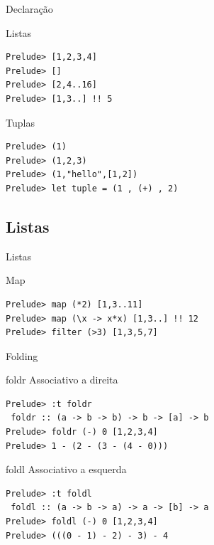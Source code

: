 \documentclass{beamer}
\begin{document}
	\begin{frame}{}
	\end{frame}
	
		\begin{frame}[fragile]{Declaração}
			\begin{block}{Listas}
		\begin{lstlisting}
Prelude> [1,2,3,4]
Prelude> []
Prelude> [2,4..16]
Prelude> [1,3..] !! 5
		 \end{lstlisting}
		\end{block}
		
		\begin{block}{Tuplas}
		\begin{lstlisting}
Prelude> (1)
Prelude> (1,2,3)
Prelude> (1,"hello",[1,2])
Prelude> let tuple = (1 , (+) , 2)
		 \end{lstlisting}
		\end{block}
		
		\end{frame}
	
	\subsection{Listas}
	
	\begin{frame}[fragile]{Listas}
		\begin{block}{Map}
			\begin{lstlisting}
Prelude> map (*2) [1,3..11]
Prelude> map (\x -> x*x) [1,3..] !! 12
Prelude> filter (>3) [1,3,5,7]
			\end{lstlisting}
		\end{block}	 
	\end{frame}
	
	\begin{frame}[fragile]{Folding}
	 \begin{block}{foldr}
	  Associativo a direita
	  \begin{lstlisting}
Prelude> :t foldr
 foldr :: (a -> b -> b) -> b -> [a] -> b
Prelude> foldr (-) 0 [1,2,3,4]
Prelude> 1 - (2 - (3 - (4 - 0)))
	  \end{lstlisting}
	 \end{block}
	 
	 \begin{block}{foldl}
	  Associativo a esquerda
	  \begin{lstlisting}
Prelude> :t foldl
 foldl :: (a -> b -> a) -> a -> [b] -> a
Prelude> foldl (-) 0 [1,2,3,4]
Prelude> (((0 - 1) - 2) - 3) - 4
	  \end{lstlisting}
	 \end{block}
	\end{frame}
	
\end{document}
